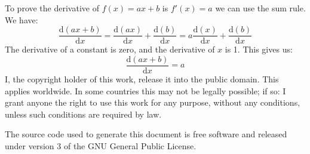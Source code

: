 \documentclass{article}
\theoremstyle{normal}
\theoremstyle{plain}
\begin{document}
    To prove the derivative of $f(x)=ax+b$ is $f'(x)=a$ we can use the sum
    rule. We have:
    \begin{equation}
        \frac{\textrm{d}(ax+b)}{\textrm{d}x}
            =\frac{\textrm{d}(ax)}{\textrm{d}x}+
                \frac{\textrm{d}(b)}{\textrm{d}x}
            =a\frac{\textrm{d}(x)}{\textrm{d}x}+
                \frac{\textrm{d}(b)}{\textrm{d}x}
    \end{equation}
    The derivative of a constant is zero, and the derivative of $x$ is 1.
    This gives us:
    \begin{equation}
        \frac{\textrm{d}(ax+b)}{\textrm{d}x}=a
    \end{equation}
    \newpage
    I, the copyright holder of this work, release it into the public domain.
    This applies worldwide. In some countries this may not be legally possible;
    if so: I grant anyone the right to use this work for any purpose, without
    any conditions, unless such conditions are required by law.
    \par\hfill\par
    The source code used to generate this document is free software and released
    under version 3 of the GNU General Public License.
\end{document}
